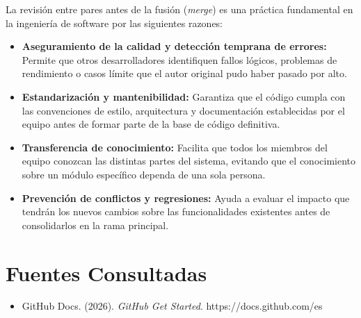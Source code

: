 \documentclass[12pt,letterpaper]{article}
\begin{document}
La revisión entre pares antes de la fusión (\textit{merge}) es una práctica fundamental en la ingeniería de software por las siguientes razones:

\begin{itemize}
    \item \textbf{Aseguramiento de la calidad y detección temprana de errores:} Permite que otros desarrolladores identifiquen fallos lógicos, problemas de rendimiento o casos límite que el autor original pudo haber pasado por alto.
    \item \textbf{Estandarización y mantenibilidad:} Garantiza que el código cumpla con las convenciones de estilo, arquitectura y documentación establecidas por el equipo antes de formar parte de la base de código definitiva.
    \item \textbf{Transferencia de conocimiento:} Facilita que todos los miembros del equipo conozcan las distintas partes del sistema, evitando que el conocimiento sobre un módulo específico dependa de una sola persona.
    \item \textbf{Prevención de conflictos y regresiones:} Ayuda a evaluar el impacto que tendrán los nuevos cambios sobre las funcionalidades existentes antes de consolidarlos en la rama principal.
\end{itemize}

\section*{Fuentes Consultadas}
\begin{itemize}
    \item GitHub Docs. (2026). \textit{GitHub Get Started}. https://docs.github.com/es
\end{itemize}
\end{document}
